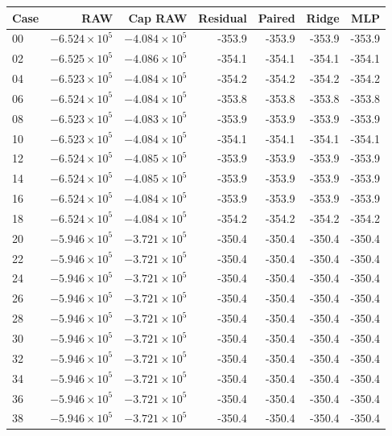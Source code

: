 \begin{tabular}{lrrrrrr}
\toprule
Case & RAW & Cap RAW & Residual & Paired & Ridge & MLP \\
\midrule
00 & \(-6.524\times10^{5}\) & \(-4.084\times10^{5}\) & -353.9 & -353.9 & -353.9 & -353.9 \\
02 & \(-6.525\times10^{5}\) & \(-4.086\times10^{5}\) & -354.1 & -354.1 & -354.1 & -354.1 \\
04 & \(-6.523\times10^{5}\) & \(-4.084\times10^{5}\) & -354.2 & -354.2 & -354.2 & -354.2 \\
06 & \(-6.524\times10^{5}\) & \(-4.084\times10^{5}\) & -353.8 & -353.8 & -353.8 & -353.8 \\
08 & \(-6.523\times10^{5}\) & \(-4.083\times10^{5}\) & -353.9 & -353.9 & -353.9 & -353.9 \\
10 & \(-6.523\times10^{5}\) & \(-4.084\times10^{5}\) & -354.1 & -354.1 & -354.1 & -354.1 \\
12 & \(-6.524\times10^{5}\) & \(-4.085\times10^{5}\) & -353.9 & -353.9 & -353.9 & -353.9 \\
14 & \(-6.524\times10^{5}\) & \(-4.085\times10^{5}\) & -353.9 & -353.9 & -353.9 & -353.9 \\
16 & \(-6.524\times10^{5}\) & \(-4.084\times10^{5}\) & -353.9 & -353.9 & -353.9 & -353.9 \\
18 & \(-6.524\times10^{5}\) & \(-4.084\times10^{5}\) & -354.2 & -354.2 & -354.2 & -354.2 \\
20 & \(-5.946\times10^{5}\) & \(-3.721\times10^{5}\) & -350.4 & -350.4 & -350.4 & -350.4 \\
22 & \(-5.946\times10^{5}\) & \(-3.721\times10^{5}\) & -350.4 & -350.4 & -350.4 & -350.4 \\
24 & \(-5.946\times10^{5}\) & \(-3.721\times10^{5}\) & -350.4 & -350.4 & -350.4 & -350.4 \\
26 & \(-5.946\times10^{5}\) & \(-3.721\times10^{5}\) & -350.4 & -350.4 & -350.4 & -350.4 \\
28 & \(-5.946\times10^{5}\) & \(-3.721\times10^{5}\) & -350.4 & -350.4 & -350.4 & -350.4 \\
30 & \(-5.946\times10^{5}\) & \(-3.721\times10^{5}\) & -350.4 & -350.4 & -350.4 & -350.4 \\
32 & \(-5.946\times10^{5}\) & \(-3.721\times10^{5}\) & -350.4 & -350.4 & -350.4 & -350.4 \\
34 & \(-5.946\times10^{5}\) & \(-3.721\times10^{5}\) & -350.4 & -350.4 & -350.4 & -350.4 \\
36 & \(-5.946\times10^{5}\) & \(-3.721\times10^{5}\) & -350.4 & -350.4 & -350.4 & -350.4 \\
38 & \(-5.946\times10^{5}\) & \(-3.721\times10^{5}\) & -350.4 & -350.4 & -350.4 & -350.4 \\
\bottomrule
\end{tabular}
